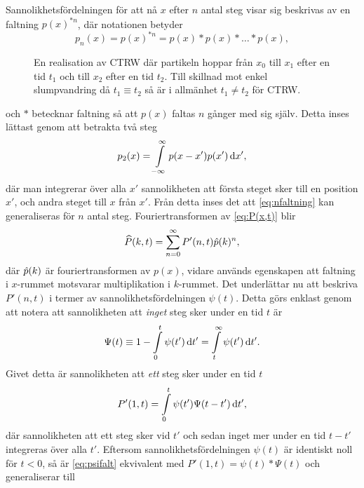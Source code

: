 Sannolikhetsfördelningen för att nå $x$ efter $n$ antal steg visar sig beskrivas av en faltning $p(x)^{*n}$, där notationen betyder 
\begin{equation}
p_n(x) = p(x)^{*n} = p(x)*p(x)*\ldots*p(x),
\end{equation}
\begin{figure}
    \centering
    
    \caption{En realisation av CTRW där partikeln hoppar från $x_0$ till $x_1$ efter en tid $t_1$ och till $x_2$ efter en tid $t_2$. Till skillnad mot enkel slumpvandring då $t_1\equiv t_2$ så är i allmänhet $t_1\neq t_2$ för CTRW.}
    \label{fig:CTRW}
\end{figure}
och $*$ betecknar faltning så att $p(x)$ faltas $n$ gånger med sig själv. Detta inses lättast genom att betrakta två steg
\begin{equation}\label{eq:nfaltning}
    p_2(x) = \int_{-\infty}^{\infty} p(x-x')p(x')\id{x'},
\end{equation}
där man integrerar över alla $x'$ sannolikheten att första steget sker till en position $x'$, och andra steget till $x$ från $x'$. Från detta inses det att \eqref{eq:nfaltning} kan generaliseras för $n$ antal steg. Fouriertransformen av \eqref{eq:P(x,t)} blir
\begin{equation}\label{eq:Pfour}
\widehat{P} (k,t) =\sum_{n=0}^{\infty} P'(n,t)\hat{p} (k)^n,
\end{equation}
där $\hat{p} (k)$ är fouriertransformen av $p(x)$, vidare används egenskapen att faltning i $x$-rummet motsvarar multiplikation i $k$-rummet. Det underlättar nu att beskriva $P'(n,t)$ i termer av sannolikhetsfördelningen $\psi (t)$. Detta görs enklast genom att notera att sannolikheten att \emph{inget} steg sker under en tid $t$ är 
\begin{equation}\label{eq:nojump}
\Psi (t) \equiv 1-\int_0^t \psi(t')\id{t'} = \int_t^{\infty} \psi(t')\id{t'}. 
\end{equation}
Givet detta är sannolikheten att \emph{ett} steg sker under en tid $t$
\begin{equation}\label{eq:psifalt}
P'(1,t) = \int_0^t\psi(t')\Psi(t-t')\id{t'},
\end{equation}
där sannolikheten att ett steg sker vid $t'$ och sedan inget mer under en tid $t-t'$ integreras över alla $t'$. Eftersom sannolikhetsfördelningen $\psi (t)$ är identiskt noll för $t<0$, så är \eqref{eq:psifalt} ekvivalent med $P'(1,t) = \psi(t)*\Psi(t)$ och generaliserar till
